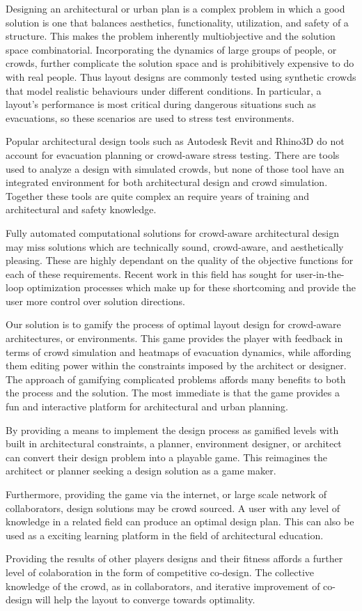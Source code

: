 Designing an architectural or urban plan is a complex problem in which a good solution is one that balances aesthetics, functionality, utilization, and safety of a structure. This makes the problem inherently multiobjective and the solution space combinatorial.  Incorporating the dynamics of large groups of people, or crowds, further complicate the solution space and is prohibitively expensive to do with real people.  Thus layout designs are commonly tested using synthetic crowds that model realistic behaviours under different conditions.  In particular, a layout's performance is most critical during dangerous situations such as evacuations, so these scenarios are used to stress test environments.

Popular architectural design tools such as Autodesk Revit and Rhino3D do not account for evacuation planning or crowd-aware stress testing. There are tools used to analyze a design with simulated crowds, but none of those tool have an integrated environment for both architectural design and crowd simulation. Together these tools are quite complex an require years of training and architectural and safety knowledge.

Fully automated computational solutions for crowd-aware architectural design may miss solutions which are technically sound, crowd-aware, and aesthetically pleasing.  These are highly dependant on the quality of the objective functions for each of these requirements. Recent work in this field has sought for user-in-the-loop optimization processes which make up for these shortcoming and provide the user more control over solution directions.

Our solution is to gamify the process of optimal layout design for crowd-aware architectures, or environments. This game provides the player with feedback in terms of crowd simulation and heatmaps of evacuation dynamics, while affording them editing power within the constraints imposed by the architect or designer. The approach of gamifying complicated problems affords many benefits to both the process and the solution. The most immediate is that the game provides a fun and interactive platform for architectural and urban planning. 

By providing a means to implement the design process as gamified levels with built in architectural constraints, a planner, environment designer, or architect can convert their design problem into a playable game.  This reimagines the architect or planner seeking a design solution as a game maker.

Furthermore, providing the game via the internet, or large scale network of collaborators, design solutions may be crowd sourced.  A user with any level of knowledge in a related field can produce an optimal design plan. This can also be used as a exciting learning platform in the field of architectural education. 

Providing the results of other players designs and their fitness affords a further level of colaboration in the form of competitive co-design.  The collective knowledge of the crowd, as in collaborators, and iterative improvement of co-design will help the layout to converge towards optimality. 